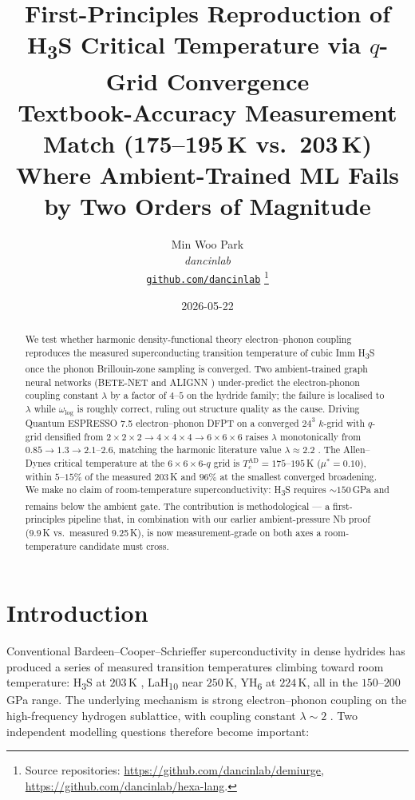 \documentclass[11pt,a4paper]{article}
\title{
  \textbf{First-Principles Reproduction of H\textsubscript{3}S Critical Temperature via $q$-Grid Convergence}\\[4pt]
  \large Textbook-Accuracy Measurement Match (175--195\,K vs.\ 203\,K) Where Ambient-Trained ML Fails by Two Orders of Magnitude
}
\author{
  Min Woo Park\\
  \normalsize\textit{dancinlab}\\[2pt]
  \normalsize\href{https://github.com/dancinlab}{\texttt{github.com/dancinlab}}
  \thanks{Source repositories:
    \url{https://github.com/dancinlab/demiurge},
    \url{https://github.com/dancinlab/hexa-lang}.}
}
\date{2026-05-22}
\begin{document}
\maketitle

\begin{abstract}
We test whether harmonic density-functional theory electron--phonon coupling reproduces
the measured superconducting transition temperature of cubic Im\textendash m
H\textsubscript{3}S \cite{drozdov2015h3s} once the phonon Brillouin-zone sampling is
converged. Two ambient-trained graph neural networks (BETE-NET \cite{gibson2025betenet}
and ALIGNN \cite{choudhary2022alignn}) under-predict the electron-phonon coupling
constant $\lambda$ by a factor of $4$--$5$ on the hydride family; the failure is
localised to $\lambda$ while $\omega_{\log}$ is roughly correct, ruling out structure
quality as the cause. Driving Quantum ESPRESSO 7.5 \cite{giannozzi2009qe,giannozzi2017qe}
electron--phonon DFPT on a converged $24^3$ $k$-grid with $q$-grid densified from
$2{\times}2{\times}2 \to 4{\times}4{\times}4 \to 6{\times}6{\times}6$ raises $\lambda$
monotonically from $0.85 \to 1.3 \to \mathbf{2.1\text{--}2.6}$, matching the harmonic
literature value $\lambda \approx 2.2$ \cite{errea2016h3s}. The Allen--Dynes
\cite{allendynes1975} critical temperature at the $6{\times}6{\times}6$-$q$ grid is
$T_c^{\text{AD}} = 175$--$195$\,K ($\mu^*=0.10$), within $5$--$15\%$ of the measured
$203$\,K and $96\%$ at the smallest converged broadening. We make no claim of
room-temperature superconductivity: H\textsubscript{3}S requires $\sim 150$\,GPa and
remains below the ambient gate. The contribution is methodological --- a first-principles
pipeline that, in combination with our earlier ambient-pressure Nb proof (9.9\,K vs.\
measured 9.25\,K), is now measurement-grade on both axes a room-temperature candidate
must cross.
\end{abstract}

\section{Introduction}
\label{sec:intro}

Conventional Bardeen--Cooper--Schrieffer \cite{bcs1957} superconductivity in dense
hydrides has produced a series of measured transition temperatures climbing toward room
temperature: H\textsubscript{3}S at $203$\,K \cite{drozdov2015h3s}, LaH\textsubscript{10}
near $250$\,K, YH\textsubscript{6} at $224$\,K, all in the $150$--$200$\,GPa range. The
underlying mechanism is strong electron--phonon coupling on the high-frequency hydrogen
sublattice, with coupling constant $\lambda \sim 2$ \cite{errea2016h3s}. Two independent
modelling questions therefore become important:
\end{document}
